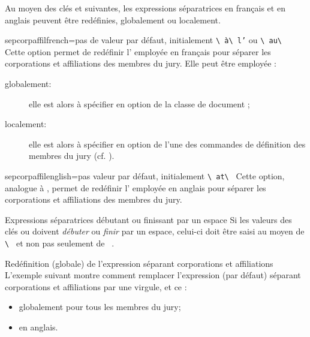 Au moyen des clés  et 
suivantes, les expressions séparatrices en français et en anglais peuvent être
redéfinies, globalement ou localement.

\begin{docKey}{sepcorpaffilfrench}{=}{pas de valeur par défaut,
    initialement \lstinline[showspaces]+\ +\texttt{à}\lstinline[showspaces]+\ +\texttt{l'} ou
    \lstinline[showspaces]+\ au\ +}
  Cette option permet de redéfinir l' employée en français pour
  séparer les corporations et affiliations des membres du jury. Elle peut être
  employée :
  \begin{description}
  \item[globalement:] elle est alors à spécifier en option de la classe de
    document ;
  \item[localement:] elle est alors à spécifier en option de l'une des
    commandes de définition des membres du jury (cf.
    ).
  \end{description}
\end{docKey}

\begin{docKey}{sepcorpaffilenglish}{=}{pas valeur par
    défaut, initialement \lstinline[showspaces]+\ at\ +}
  Cette option, analogue à , permet de redéfinir
  l' employée en anglais pour séparer les corporations et
  affiliations des membres du jury.
\end{docKey}

\begin{dbwarning}{Expressions séparatrices débutant ou finissant par un espace}{}
  Si les valeurs des clés  ou
   doivent \emph{débuter} ou \emph{finir} par un
  espace, celui-ci doit être saisi au moyen de
  \lstinline[showspaces]+\ +
  et non pas seulement de
  \lstinline[showspaces]+ +.
\end{dbwarning}

\begin{dbexample}{Redéfinition (globale) de l'expression séparant corporations
    et affiliations}{}
  L'exemple suivant montre comment remplacer l'expression (par défaut) séparant
  corporations et affiliations par une virgule, et ce :
  \begin{itemize}
  \item globalement pour tous les membres du jury;
  \item en anglais.
  \end{itemize}
\end{dbexample}

